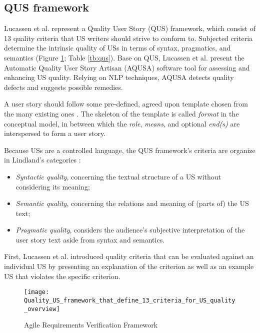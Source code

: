 \subsection{QUS framework} \label{usq_3}
Lucassen et al. \cite{lucassen2016improving} represent a Quality User Story (QUS) framework, which consist of 13 quality criteria that US writers should strive to conform to. Subjected criteria determine the intrinsic quality of USs in terms of syntax, pragmatics, and semantics (Figure \ref{fig:qus_framework}; Table \ref{tb:qus}). Base on QUS, Lucassen et al. present the Automatic Quality User Story Artisan (AQUSA) software tool for assessing and enhancing US quality. Relying on NLP techniques, AQUSA detects quality defects and suggests possible remedies.

A user story should follow some pre-defined, agreed upon template chosen from the many existing ones \cite{wautelet2014unifying}. The skeleton of the template is called \emph{format} in the conceptual model, in between which the \emph{role}, \emph{means}, and optional \emph{end(s)} are interspersed to form a user story. 

Because USs are a controlled language, the QUS framework’s criteria are organize in Lindland’s categories \cite{lindland1994understanding}:

\begin{itemize}
\item\emph{ Syntactic quality}, concerning the textual structure of a US without considering its meaning;
\item \emph{Semantic quality}, concerning the relations and meaning of (parts of) the US text;
\item \emph{Pragmatic quality}, considers the audience’s subjective interpretation of the user story text aside from syntax and semantics.
\end{itemize}

First, Lucassen et al. introduced quality criteria that can be evaluated against an individual US by presenting an explanation of the criterion as well as an example US that violates the specific criterion.


\begin{figure}
\center
\texttt{[image: Quality\_US\_framework\_that\_define\_13\_criteria\_for\_US\_quality\_overview]}
\caption{Agile Requirements Verification Framework \cite{lucassen2016improving}}\label{fig:qus_framework}
\end{figure}

